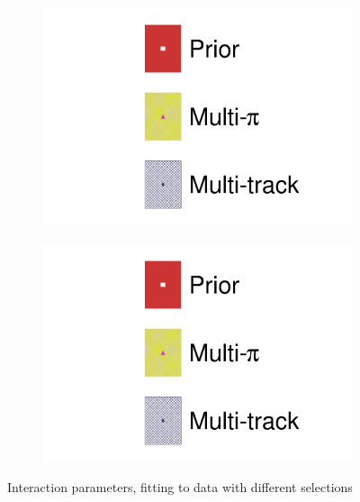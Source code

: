 \begin{figure}[h]
	\begin{subfigure}[t]{0.49\textwidth}
		\includegraphics[width=\textwidth,page=20, trim={0mm 0mm 0mm 9mm}, clip]{figures/mach3/2018/data/2018a_FixedCov_RedCov_Mpi_Data_merg_2018a_NewDetMatrix_OrderSwitched_Data2to8_ActualData_merge}
	\end{subfigure}
	\begin{subfigure}[t]{0.49\textwidth}
		\includegraphics[width=\textwidth,page=21, trim={0mm 0mm 0mm 9mm}, clip]{figures/mach3/2018/data/2018a_FixedCov_RedCov_Mpi_Data_merg_2018a_NewDetMatrix_OrderSwitched_Data2to8_ActualData_merge}
	\end{subfigure}
	\caption{Interaction parameters, fitting to data with different selections}
	\label{fig:data_multitrack_multipi_xsec}
\end{figure}

